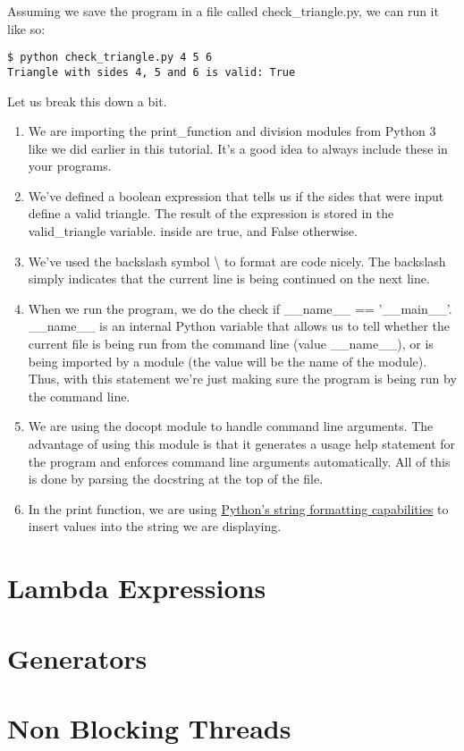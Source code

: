 Assuming we save the program in a file called check\_triangle.py, we can
run it like so:

\begin{lstlisting}
$ python check_triangle.py 4 5 6
Triangle with sides 4, 5 and 6 is valid: True
\end{lstlisting}

Let us break this down a bit.

\begin{enumerate}
\tightlist
\item
  We are importing the print\_function and division modules from Python
  3 like we did earlier in this tutorial. It's a good idea to always
  include these in your programs.
\item
  We've defined a boolean expression that tells us if the sides that
  were input define a valid triangle. The result of the expression is
  stored in the valid\_triangle variable. inside are true, and False
  otherwise.
\item
  We've used the backslash symbol \textbackslash{} to format are code
  nicely. The backslash simply indicates that the current line is being
  continued on the next line.
\item
  When we run the program, we do the check if \_\_name\_\_ ==
  '\_\_main\_\_'. \_\_name\_\_ is an internal Python variable that
  allows us to tell whether the current file is being run from the
  command line (value \_\_name\_\_), or is being imported by a module
  (the value will be the name of the module). Thus, with this statement
  we're just making sure the program is being run by the command line.
\item
  We are using the docopt module to handle command line arguments. The
  advantage of using this module is that it generates a usage help
  statement for the program and enforces command line arguments
  automatically. All of this is done by parsing the docstring at the top
  of the file.
\item
  In the print function, we are using
  \href{https://docs.python.org/2/library/string.html\#format-string-syntax}{Python's
  string formatting capabilities} to insert values into the string we
  are displaying.
\end{enumerate}

\section{Lambda Expressions}


\section{Generators}


\section{Non Blocking Threads}


